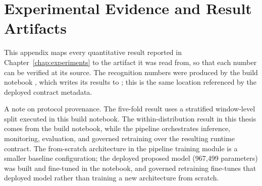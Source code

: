 \chapter{Experimental Evidence and Result Artifacts}
\label{app:evidence}

This appendix maps every quantitative result reported in Chapter~\ref{chap:experiments} to the artifact it was read from, so that each number can be verified at its source. The recognition numbers were produced by the build notebook , which writes its results to ; this is the same location referenced by the deployed contract metadata.

A note on protocol provenance. The five-fold result uses a stratified window-level split executed in this build notebook. The within-distribution result in this thesis comes from the build notebook, while the pipeline orchestrates inference, monitoring, evaluation, and governed retraining over the resulting runtime contract. The from-scratch architecture in the pipeline training module is a smaller baseline configuration; the deployed proposed model (967{,}499 parameters) was built and fine-tuned in the notebook, and governed retraining fine-tunes that deployed model rather than training a new architecture from scratch.

